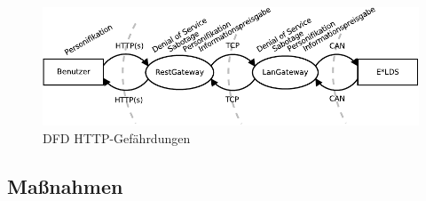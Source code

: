 \documentclass[11pt,a4paper]{report}
\begin{document}
\begin{figure}[htbp]
\centering
\includegraphics[scale=1]{images/dfd_http_threat.pdf}
\caption{DFD HTTP-Gefährdungen}
\label{fig:dfd_http_threat}
\end{figure}

\subsection{Maßnahmen} \label{sec:mod_measures_user}
\end{document}
